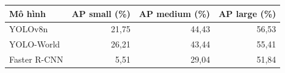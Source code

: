 \begin{tabular}{lrrr}
\toprule
Mô hình & AP small (\%) & AP medium (\%) & AP large (\%) \\
\midrule
YOLOv8n & 21{,}75 & 44{,}43 & 56{,}53 \\
YOLO-World & 26{,}21 & 43{,}44 & 55{,}41 \\
Faster R-CNN & 5{,}51 & 29{,}04 & 51{,}84 \\
\bottomrule
\end{tabular}
